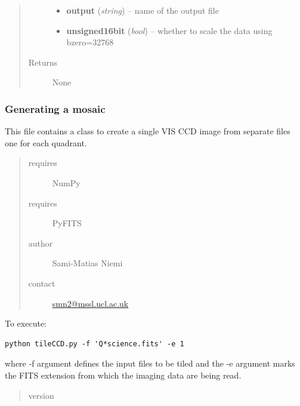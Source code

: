 \documentclass[a4paper,12pt,english]{sphinxmanual}
\begin{document}
\begin{fulllineitems}
\begin{fulllineitems}
\begin{quote}
\begin{description}
\begin{itemize}
\item {} 
\textbf{output} (\emph{string}) -- name of the output file

\item {} 
\textbf{unsigned16bit} (\emph{bool}) -- whether to scale the data using bzero=32768

\end{itemize}

\item[{Returns}] \leavevmode
None

\end{description}\end{quote}

\end{fulllineitems}


\end{fulllineitems}

\label{postproc:module-postproc.tileCCD}

\subsubsection{Generating a mosaic}
\label{postproc:generating-a-mosaic}
This file contains a class to create a single VIS CCD image from separate files one for each quadrant.
\begin{quote}\begin{description}
\item[{requires}] \leavevmode
NumPy

\item[{requires}] \leavevmode
PyFITS

\item[{author}] \leavevmode
Sami-Matias Niemi

\item[{contact}] \leavevmode
\href{mailto:smn2@mssl.ucl.ac.uk}{smn2@mssl.ucl.ac.uk}

\end{description}\end{quote}

To execute:

\begin{Verbatim}[commandchars=\\\{\}]
python tileCCD.py -f 'Q*science.fits' -e 1
\end{Verbatim}

where -f argument defines the input files to be tiled and the -e argument marks the
FITS extension from which the imaging data are being read.
\begin{quote}\begin{description}
\item[{version}] 

\end{description}\end{quote}
\end{document}
